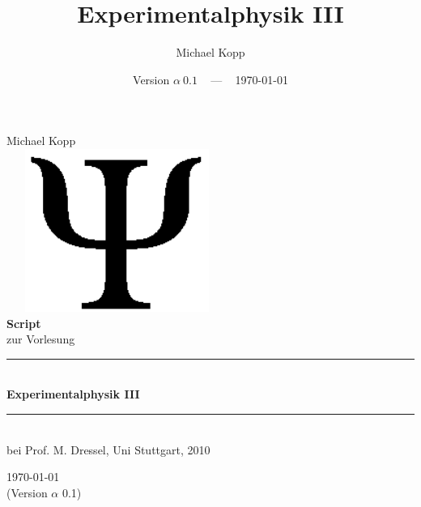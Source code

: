 \documentclass[twoside,a4paper]{book}
\title{Experimentalphysik III}
\author{Michael Kopp}
\date{Version $\alpha ~ 0.1$ ~ --- ~ \today}
\begin{document}
\frontmatter


\begin{titlepage}
\begin{center}
\vspace{3em}

{\large \sc  Michael Kopp}\\[8em]
~ ~ \includegraphics[width=0.45\textwidth]{psi}\\[5em]
{\huge \bf Script}\\[0.03\textheight]
{zur Vorlesung}\\[0.08\textheight]
\hrule ~\\[0.4cm]
{\bf \fontsize{35px}{1px} \selectfont Experimentalphysik III}\\[0.4cm]
\hrule ~ \\[8em] %
{bei Prof. M. Dressel, Uni Stuttgart, 2010}

\vfill

{ \today \\(Version $\alpha$ 0.1)}
\end{center}
\end{titlepage}


\tableofcontents


\sloppy		








\end{document}
